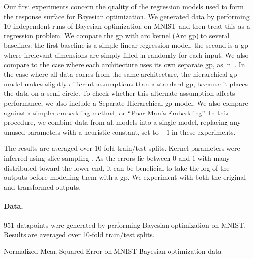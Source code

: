 \documentclass{article}
\newcommand{\note}[1]{}
\newcommand{\gp}{{\sc gp}}
\newcommand{\agp}{Arc \gp}
\begin{document}
Our first experiments concern the quality of the regression models used to form the response surface for Bayesian optimization.
We generated data by performing 10 independent runs of Bayesian optimization on MNIST and then treat this as a regression problem.
We compare the \gp{} with arc kernel (\agp) to several baselines: the first baseline is a simple linear regression model, the second is a \gp{}  where irrelevant dimensions are simply filled in randomly for each input.
We also compare to the case where each architecture uses its own separate \gp{}, as in~\cite{bergstra2011algorithms}.
In the case where all data comes from the same architecture, the hierarchical {\sc gp} model makes slightly different assumptions than a standard {\sc gp}, because it places the data on a semi-circle.
To check whether this alternate assumption affects performance, we also include a Separate-Hierarchical {\sc gp} model.
We also compare against a simpler embedding method, or ``Poor Man's Embedding''.
In this procedure, we combine data from all models into a single model, replacing any unused parameters with a heuristic constant, set to $-1$ in these experiments.

The results are averaged over $10$-fold train/test splits. Kernel parameters were inferred using slice sampling \cite{Murray-Adams-2010a}.
As the errors lie between $0$ and $1$ with many distributed toward the lower end, it can be beneficial to take the log of the outputs before modelling them with a \gp{}.
We experiment with both the original and transformed outputs.





\paragraph{Data.} 951 datapoints were generated by performing Bayesian optimization on MNIST.  Results are averaged over 10-fold train/test splits.


\begin{table}[h!]
\caption{\small Normalized Mean Squared Error on MNIST Bayesian optimization data\label{tab:nn_error}}
\label{tbl:nn_nmse}

%
\vspace{-0.3cm}
\end{table}
\end{document}
